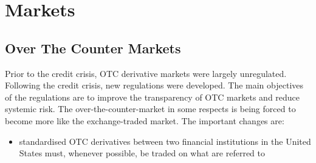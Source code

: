 \chapter{Markets}

\section{Over The Counter Markets}
Prior to the credit crisis, OTC derivative markets were largely unregulated. Following the credit crisis, new regulations were developed. The main objectives of the regulations are to improve the transparency of OTC markets and reduce systemic risk. The over-the-counter-market in some respects is being forced to become more like the exchange-traded market. The important changes are:
\begin{itemize}
	\item standardised OTC derivatives between two financial institutions in the United States must, whenever possible, be traded on what are referred to \textbf{\color{blue}}
\end{itemize}